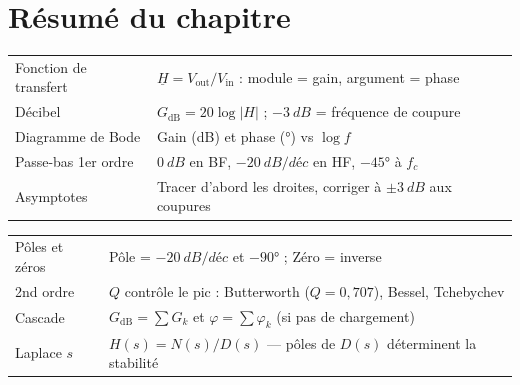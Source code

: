\documentclass[12pt,a4paper,twoside]{book}
\begin{document}
\section*{Résumé du chapitre}

\begin{bases}[title={\color{white} Résumé --- Les Bases}]
\begin{center}
\renewcommand{\arraystretch}{1.3}
\begin{tabular}{p{4cm}p{9cm}}
\toprule
Fonction de transfert & $\underline{H} = V_{\text{out}}/V_{\text{in}}$ : module = gain, argument = phase \\
Décibel & $G_{\text{dB}} = 20\log|H|$ ; $-\SI{3}{dB}$ = fréquence de coupure \\
Diagramme de Bode & Gain (dB) et phase (°) vs $\log f$ \\
Passe-bas 1er ordre & $\SI{0}{dB}$ en BF, $-\SI{20}{dB/déc}$ en HF, $-45°$ à $f_c$ \\
Asymptotes & Tracer d'abord les droites, corriger à $\pm\SI{3}{dB}$ aux coupures \\
\bottomrule
\end{tabular}
\end{center}
\end{bases}

\begin{approfondissement}[title={\color{white} Résumé --- Approfondissement}]
\begin{center}
\renewcommand{\arraystretch}{1.3}
\begin{tabular}{p{4cm}p{9cm}}
\toprule
Pôles et zéros & Pôle = $-\SI{20}{dB/déc}$ et $-90°$ ; Zéro = inverse \\
2nd ordre & $Q$ contrôle le pic : Butterworth ($Q=0{,}707$), Bessel, Tchebychev \\
Cascade & $G_{\text{dB}} = \sum G_k$ et $\varphi = \sum\varphi_k$ (si pas de chargement) \\
Laplace $s$ & $H(s) = N(s)/D(s)$ --- pôles de $D(s)$ déterminent la stabilité \\
\bottomrule
\end{tabular}
\end{center}
\end{approfondissement}
\end{document}
